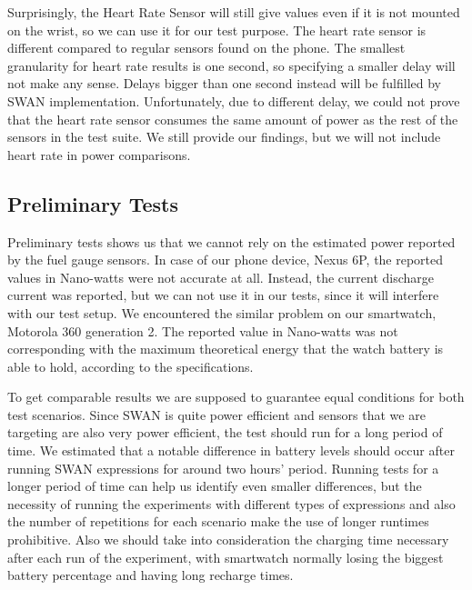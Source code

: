Surprisingly, the Heart Rate Sensor will still give values even if it is not mounted on the wrist, so we can use it for our test purpose. 
The heart rate sensor is different compared to regular sensors found on the phone. The smallest granularity for heart rate results is one second,
so specifying a smaller delay will not make any sense.  Delays bigger than one second instead will be fulfilled by SWAN implementation.
Unfortunately, due to different delay, we could not prove that the heart rate sensor consumes the same amount of power as the rest of the sensors in the test suite.
We still provide our findings, but we will not include heart rate in power comparisons.
 
 \subsection{Preliminary Tests}
Preliminary tests shows us that we cannot rely on the estimated power reported by the fuel gauge sensors. In case of our phone device,
Nexus 6P, the reported values in Nano-watts were not accurate at all. Instead, the current discharge current was reported, 
but we can not use it in our tests, since it will interfere with our test setup.
We encountered the similar problem on our smartwatch, Motorola 360 generation 2. 
The reported value in Nano-watts was not corresponding with the maximum theoretical energy that the watch battery is able to hold, according to the specifications.

To get comparable results we are supposed to guarantee equal conditions for both test scenarios.
Since SWAN is quite power efficient and sensors that we are targeting are also very power efficient, the test should run for a long period of time.
We estimated that a notable difference in battery levels should occur after running SWAN expressions for around two hours' period.
Running tests for a longer period of time can help us identify even smaller differences, 
but the necessity of running the experiments with different types of expressions and also the number of repetitions for each scenario make the use of longer runtimes prohibitive.
Also we should take into consideration the charging time necessary after each run of the experiment,
with smartwatch normally losing the biggest battery percentage  and having long recharge times.


